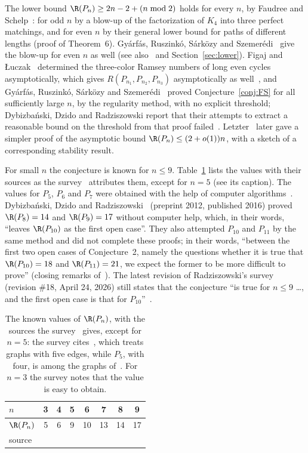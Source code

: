 The lower bound $\R(P_n)\ge 2n-2+(n\bmod2)$ holds for every $n$, by
Faudree and Schelp~\cite{FS75}: for odd $n$ by a blow-up of the
factorization of $K_4$ into three perfect matchings, and for even $n$ by
their general lower bound for paths of different lengths (proof of
Theorem~6). Gyárfás, Ruszinkó, Sárközy and Szemerédi~\cite{GRSS07} give
the blow-up for even $n$ as well (see also~\cite{DDR16} and
Section~\ref{sec:lower}). Figaj and
Łuczak~\cite{FL07} determined the three-color Ramsey numbers of long
even cycles asymptotically, which gives $R(P_{n_1},P_{n_2},P_{n_3})$
asymptotically as well~\cite[Section~6.4.1(a)]{Rad26}, and Gyárfás, Ruszinkó, Sárközy and
Szemerédi~\cite{GRSS07} proved Conjecture~\ref{conj:FS} for all
sufficiently large $n$, by the regularity method, with no explicit
threshold; Dybizbański, Dzido and Radziszowski report that their attempts
to extract a reasonable bound on the threshold from that proof
failed~\cite[Section~2]{DDR16}. Letzter~\cite{Let22} later gave a simpler
proof of the asymptotic bound $\R(P_n)\le(2+o(1))n$, with a sketch of a
corresponding stability result.

For small $n$ the conjecture is known for $n\le 9$. Table~\ref{tab:known}
lists the values with their sources as the survey~\cite[Section~6.4.1(c)]{Rad26}
attributes them, except for $n=5$ (see its caption). The values for $P_5$, $P_6$ and $P_7$ were obtained with
the help of computer algorithms~\cite[Section~2]{DDR16}. Dybizbański,
Dzido and Radziszowski~\cite{DDR16} (preprint 2012, published 2016) proved
$\R(P_8)=14$ and $\R(P_9)=17$ without computer help, which, in their words, ``leaves
$\R(P_{10})$ as the first open case''. They also attempted $P_{10}$ and
$P_{11}$ by the same method and did not complete these proofs; in their
words, ``between the first two open cases of Conjecture~2, namely the
questions whether it is true that $\R(P_{10})=18$ and $\R(P_{11})=21$, we
expect the former to be more difficult to prove'' (closing remarks
of~\cite{DDR16}). The latest revision of Radziszowski's survey
(revision \#18, April 24, 2026) still states that the conjecture ``is true
for $n\le 9$ \dots, and the first open case is that for
$P_{10}$''~\cite[Section~6.4]{Rad26}.

\begin{table}[ht]
\centering
\begin{tabular}{@{}lccccccc@{}}
\toprule
$n$ & 3 & 4 & 5 & 6 & 7 & 8 & 9\\
\midrule
$\R(P_n)$ & 5 & 6 & 9 & 10 & 13 & 14 & 17\\
source & \cite[Ea1]{Rad26} & \cite{Irv74} & \cite{YR94} & \cite{YR92} & \cite{Yan95} & \cite{DDR16} & \cite{DDR16}\\
\bottomrule
\end{tabular}
\medskip
\caption{The known values of $\R(P_n)$, with the sources the survey~\cite{Rad26}
gives, except for $n=5$: the survey cites~\cite{YR92}, which treats graphs
with five edges, while $P_5$, with four, is among the graphs
of~\cite{YR94}. For $n=3$ the survey notes that the value is easy to
obtain.}\label{tab:known}
\end{table}

